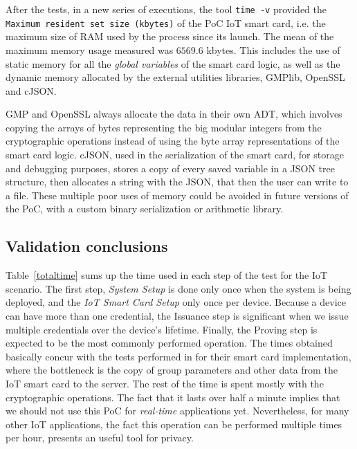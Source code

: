 After the tests, in a new series of executions, the tool \texttt{time -v} provided the \texttt{Maximum resident set size (kbytes)} of the PoC IoT smart card, i.e. the maximum size of RAM used by the process since its launch. The mean of the maximum memory usage measured was $6569.6$ kbytes. This includes the use of static memory for all the \textit{global variables} of the smart card logic, as well as the dynamic memory allocated by the external utilities libraries, GMPlib, OpenSSL and cJSON.

GMP and OpenSSL always allocate the data in their own ADT, which involves copying the arrays of bytes representing the big modular integers from the cryptographic operations instead of using the byte array representations of the smart card logic. cJSON, used in the serialization of the smart card, for storage and debugging purposes, stores a copy of every saved variable in a JSON tree structure, then allocates a string with the JSON, that then the user can write to a file.
These multiple poor uses of memory could be avoided in future versions of the PoC, with a custom binary serialization or arithmetic library.


\subsection{Validation conclusions}


Table~\ref{totaltime} sums up the time used in each step of the test for the IoT scenario.
The first step, \textit{System Setup} is done only once when the system is being deployed, and the \textit{IoT Smart Card Setup} only once per device.
Because a device can have more than one credential, the Issuance step is significant when we issue multiple credentials over the device's lifetime.
Finally, the Proving step is expected to be the most commonly performed operation. The times obtained basically concur with the tests performed in \cite{D42} for their smart card implementation, where the bottleneck is the copy of group parameters and other data from the IoT smart card to the server. The rest of the time is spent mostly with the cryptographic operations. 
The fact that it lasts over half a minute implies that we should not use this PoC for \textit{real-time} applications yet. 
Nevertheless, for many other IoT applications, the fact this operation can be performed multiple times per hour, presents an useful tool for privacy. 


